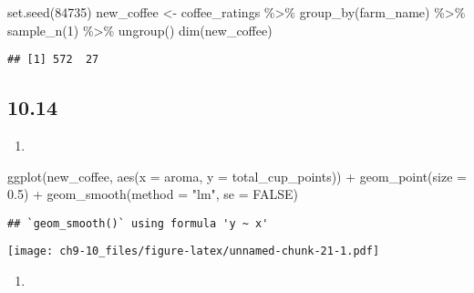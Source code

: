 \documentclass[
]{article}
\newenvironment{Shaded}{\begin{snugshade}}{\end{snugshade}}
\newcommand{\AttributeTok}[1]{\textcolor[rgb]{0.77,0.63,0.00}{#1}}
\newcommand{\ConstantTok}[1]{\textcolor[rgb]{0.00,0.00,0.00}{#1}}
\newcommand{\DecValTok}[1]{\textcolor[rgb]{0.00,0.00,0.81}{#1}}
\newcommand{\FloatTok}[1]{\textcolor[rgb]{0.00,0.00,0.81}{#1}}
\newcommand{\FunctionTok}[1]{\textcolor[rgb]{0.00,0.00,0.00}{#1}}
\newcommand{\NormalTok}[1]{#1}
\newcommand{\OtherTok}[1]{\textcolor[rgb]{0.56,0.35,0.01}{#1}}
\newcommand{\SpecialCharTok}[1]{\textcolor[rgb]{0.00,0.00,0.00}{#1}}
\newcommand{\StringTok}[1]{\textcolor[rgb]{0.31,0.60,0.02}{#1}}
\providecommand{\tightlist}{%
  \setlength{\itemsep}{0pt}\setlength{\parskip}{0pt}}
\begin{document}
\begin{Shaded}
\begin{Highlighting}[]
\FunctionTok{set.seed}\NormalTok{(}\DecValTok{84735}\NormalTok{)}
\NormalTok{new\_coffee }\OtherTok{\textless{}{-}}\NormalTok{ coffee\_ratings }\SpecialCharTok{\%\textgreater{}\%} 
  \FunctionTok{group\_by}\NormalTok{(farm\_name) }\SpecialCharTok{\%\textgreater{}\%} 
  \FunctionTok{sample\_n}\NormalTok{(}\DecValTok{1}\NormalTok{) }\SpecialCharTok{\%\textgreater{}\%} 
  \FunctionTok{ungroup}\NormalTok{()}
\FunctionTok{dim}\NormalTok{(new\_coffee)}
\end{Highlighting}
\end{Shaded}

\begin{verbatim}
## [1] 572  27
\end{verbatim}

\hypertarget{section-9}{%
\subsection{10.14}\label{section-9}}

\begin{enumerate}
\def\labelenumi{\alph{enumi}.}
\tightlist
\item
\end{enumerate}

\begin{Shaded}
\begin{Highlighting}[]
\FunctionTok{ggplot}\NormalTok{(new\_coffee, }\FunctionTok{aes}\NormalTok{(}\AttributeTok{x =}\NormalTok{ aroma, }\AttributeTok{y =}\NormalTok{ total\_cup\_points)) }\SpecialCharTok{+} 
  \FunctionTok{geom\_point}\NormalTok{(}\AttributeTok{size =} \FloatTok{0.5}\NormalTok{) }\SpecialCharTok{+} 
  \FunctionTok{geom\_smooth}\NormalTok{(}\AttributeTok{method =} \StringTok{"lm"}\NormalTok{, }\AttributeTok{se =} \ConstantTok{FALSE}\NormalTok{)}
\end{Highlighting}
\end{Shaded}

\begin{verbatim}
## `geom_smooth()` using formula 'y ~ x'
\end{verbatim}

\texttt{[image: ch9-10\_files/figure-latex/unnamed-chunk-21-1.pdf]}

\begin{enumerate}
\def\labelenumi{\alph{enumi}.}
\setcounter{enumi}{1}
\tightlist
\item
\end{enumerate}
\end{document}
